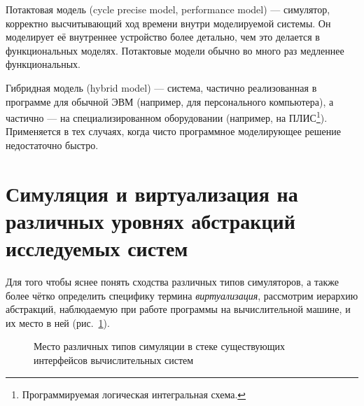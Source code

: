 \begin{description*}
\item[Потактовая модель] (\abbr cycle precise model, performance model)  --- симулятор, корректно высчитывающий ход времени внутри моделируемой системы. Он моделирует её внутреннее устройство более детально, чем это делается в функциональных моделях. Потактовые модели обычно во много раз медленнее функциональных.

\item[Гибридная модель] (\abbr hybrid model) --- система, частично реализованная в программе для обычной ЭВМ (например, для персонального компьютера), а частично --- на специализированном оборудовании (например, на ПЛИС\footnote{Программируемая логическая интегральная схема.}). Применяется в тех случаях, когда чисто программное моделирующее решение недостаточно быстро.

\end{description*}

\section[Симуляция и виртуализация на различных уровнях]{Симуляция и виртуализация на различных уровнях абстракций исследуемых систем}

Для того чтобы яснее понять сходства различных типов симуляторов, а также более чётко определить специфику термина \emph{виртуализация}, рассмотрим иерархию абстракций, наблюдаемую при работе программы на вычислительной машине, и их место в ней (рис.~\ref{fig:simulation-levels}). 

\begin{figure}[htb]
    \centering
    \caption[Место различных типов симуляции]{Место различных типов симуляции в стеке существующих интерфейсов вычислительных систем}
    \label{fig:simulation-levels}
\end{figure}

